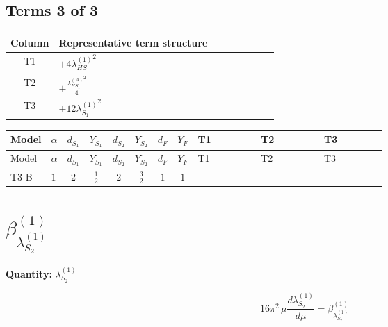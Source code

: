 \documentclass[8pt]{article}
\begin{document}
\begin{landscape}
\subsection*{Terms 3 of 3}
\begin{center}
\begin{tabular}{@{}c >{\raggedright\arraybackslash}p{0.82\linewidth}@{}}
\toprule
Column & Representative term structure \\
\midrule
T1 & \(\displaystyle +4 {\lambda_{HS_1}^{(1)}}^2\) \\
\midrule
T2 & \(\displaystyle +\frac{{\lambda_{HS_1}^{(A)}}^2}{4}\) \\
\midrule
T3 & \(\displaystyle +12 {\lambda_{S_1}^{(1)}}^2\) \\
\midrule
\bottomrule
\end{tabular}
\end{center}
\smallskip
\tiny
\begin{longtable}{@{}llcccccc >{\raggedright\arraybackslash}p{0.21\linewidth} >{\raggedright\arraybackslash}p{0.21\linewidth} >{\raggedright\arraybackslash}p{0.21\linewidth}@{}}
\toprule
Model & $\alpha$ & $d_{S_1}$ & $Y_{S_1}$ & $d_{S_2}$ & $Y_{S_2}$ & $d_F$ & $Y_F$ & T1 & T2 & T3 \\
\midrule
\endfirsthead
\toprule
Model & $\alpha$ & $d_{S_1}$ & $Y_{S_1}$ & $d_{S_2}$ & $Y_{S_2}$ & $d_F$ & $Y_F$ & T1 & T2 & T3 \\
\midrule
\endhead
T3-B & $1$ & $2$ & $\frac{1}{2}$ & $2$ & $\frac{3}{2}$ & $1$ & $1$ & \scriptsize\adjustbox{max width=\linewidth}{$\begin{gathered} +4 {\lambda_{HS_1}^{(1)}}^2\end{gathered}$} & \scriptsize\adjustbox{max width=\linewidth}{$\begin{gathered} +\frac{{\lambda_{HS_1}^{(A)}}^2}{4}\end{gathered}$} & \scriptsize\adjustbox{max width=\linewidth}{$\begin{gathered} +12 {\lambda_{S_1}^{(1)}}^2\end{gathered}$} \\
\midrule
\bottomrule
\end{longtable}
\clearpage
\section*{$\beta_{\lambda_{S_2}^{(1)}}^{(1)}$}
\noindent\textbf{Quantity: }$\lambda_{S_2}^{(1)}$\par\smallskip
\[16\pi^2\,\mu\frac{d \lambda_{S_2}^{(1)}}{d\mu}=\beta_{\lambda_{S_2}^{(1)}}^{(1)}\]

\end{landscape}
\end{document}
